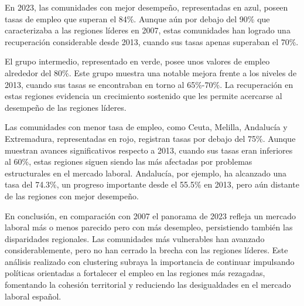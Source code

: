 \documentclass[notspecified,article,submit,moreauthors,pdftex]{Definitions/mdpi}
\begin{document}
En 2023, las comunidades con mejor desempeño, representadas en azul,
poseen tasas de empleo que superan el 84\%. Aunque aún por debajo del
90\% que caracterizaba a las regiones líderes en 2007, estas comunidades
han logrado una recuperación considerable desde 2013, cuando sus tasas
apenas superaban el 70\%.

El grupo intermedio, representado en verde, posee unos valores de empleo
alrededor del 80\%. Este grupo muestra una notable mejora frente a los
niveles de 2013, cuando sus tasas se encontraban en torno al 65\%-70\%.
La recuperación en estas regiones evidencia un crecimiento sostenido que
les permite acercarse al desempeño de las regiones líderes.

Las comunidades con menor tasa de empleo, como Ceuta, Melilla, Andalucía
y Extremadura, representadas en rojo, registran tasas por debajo del
75\%. Aunque muestran avances significativos respecto a 2013, cuando sus
tasas eran inferiores al 60\%, estas regiones siguen siendo las más
afectadas por problemas estructurales en el mercado laboral. Andalucía,
por ejemplo, ha alcanzado una tasa del 74.3\%, un progreso importante
desde el 55.5\% en 2013, pero aún distante de las regiones con mejor
desempeño.

En conclusión, en comparación con 2007 el panorama de 2023 refleja un
mercado laboral más o menos parecido pero con más desempleo,
persistiendo también las disparidades regionales. Las comunidades más
vulnerables han avanzado considerablemente, pero no han cerrado la
brecha con las regiones líderes. Este análisis realizado con clustering
subraya la importancia de continuar impulsando políticas orientadas a
fortalecer el empleo en las regiones más rezagadas, fomentando la
cohesión territorial y reduciendo las desigualdades en el mercado
laboral español.


\vspace{6pt}



\end{document}
